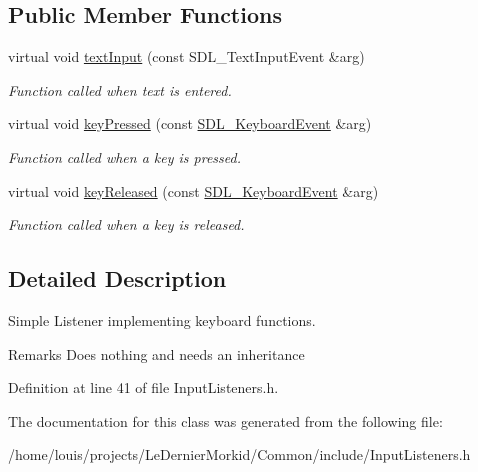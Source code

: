 \subsection*{Public Member Functions}
\begin{DoxyCompactItemize}
\item 
\mbox{\label{class_common_1_1_keyboard_listener_ac59d0721df35da0d3346b102845a92b2}} 
virtual void \hyperlink{class_common_1_1_keyboard_listener_ac59d0721df35da0d3346b102845a92b2}{text\+Input} (const S\+D\+L\+\_\+\+Text\+Input\+Event \&arg)
\begin{DoxyCompactList}\small\item\em Function called when text is entered. \end{DoxyCompactList}\item 
\mbox{\label{class_common_1_1_keyboard_listener_a1c6fd0d269a2590fcc7c2fa5aca78f5d}} 
virtual void \hyperlink{class_common_1_1_keyboard_listener_a1c6fd0d269a2590fcc7c2fa5aca78f5d}{key\+Pressed} (const \hyperlink{struct_s_d_l___keyboard_event}{S\+D\+L\+\_\+\+Keyboard\+Event} \&arg)
\begin{DoxyCompactList}\small\item\em Function called when a key is pressed. \end{DoxyCompactList}\item 
\mbox{\label{class_common_1_1_keyboard_listener_a99446142b6d4d6bb230b503afc021e12}} 
virtual void \hyperlink{class_common_1_1_keyboard_listener_a99446142b6d4d6bb230b503afc021e12}{key\+Released} (const \hyperlink{struct_s_d_l___keyboard_event}{S\+D\+L\+\_\+\+Keyboard\+Event} \&arg)
\begin{DoxyCompactList}\small\item\em Function called when a key is released. \end{DoxyCompactList}\end{DoxyCompactItemize}


\subsection{Detailed Description}
Simple Listener implementing keyboard functions. 

\begin{DoxyRemark}{Remarks}
Does nothing and needs an inheritance 
\end{DoxyRemark}


Definition at line 41 of file Input\+Listeners.\+h.



The documentation for this class was generated from the following file\+:\begin{DoxyCompactItemize}
\item 
/home/louis/projects/\+Le\+Dernier\+Morkid/\+Common/include/Input\+Listeners.\+h\end{DoxyCompactItemize}
